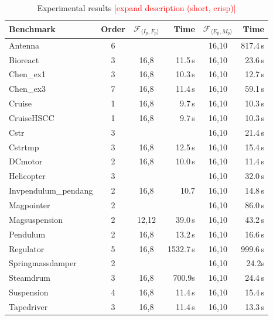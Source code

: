 \documentclass[twocolumn]{autart}    %
\newcommand{\xmark}{\ding{55}}
\renewcommand{\note}[1]{\textcolor{red}{[#1]}}
\begin{document}
\begin{table}
\centering
\begin{tabular}{| l | c | c | r | c | r |}
%
\hline
 Benchmark  &  Order  & $\mathcal{F}_{\langle I_p,F_p \rangle}$ & Time & $\mathcal{F}_{\langle E_p, M_p \rangle}$ & Time \\\hline
 Antenna     & 6 &  & ~\xmark & 16,10 & 817.4\,s \\
 Bioreact    & 3 & 16,8 & 11.5\,s & 16,10 &23.6\,s \\
 Chen\_ex1   & 3 & 16,8 & 10.3\,s  & 16,10 & 12.7\,s \\
 Chen\_ex3   & 7 & 16,8  & 11.4\,s & 16,10 & 59.1\,s \\
 Cruise      & 1 & 16,8 & 9.7\,s & 16,10 & 10.3\,s \\
 CruiseHSCC & 1 & 16,8 & 9.7\,s & 16,10 & 10.3\,s  \\
 Cstr & 3 & & ~\xmark & 16,10 & 21.4\,s \\
 Cstrtmp  & 3 & 16,8 & 12.5\,s &16,10 & 15.4\,s \\
 DCmotor   & 2 & 16,8  & 10.0\,s & 16,10 & 11.4\,s  \\
 Helicopter   & 3 &  & ~\xmark & 16,10 & 32.0\,s \\
 Invpendulum\_pendang & 2 & 16,8  & 10.7 & 16,10 & 14.8\,s\\
 Magpointer   & 2 &  & ~\xmark & 16,10 & 86.0\,s \\
 Magsuspension  & 2 & 12,12  & 39.0\,s  & 16,10 & 43.2\,s \\
 Pendulum   & 2 & 16,8 & 13.2\,s & 16,10 & 16.6\,s\\
 Regulator   & 5 & 16,8 & 1532.7\,s & 16,10 & 999.6\,s\\
 Springmassdamper & 2 & & ~\xmark &16,10 & 24.2s \\
 Steamdrum   & 3 & 16,8  & 700.9s & 16,10 & 24.4\,s \\
 Suspension  & 4 & 16,8  & 11.4\,s & 16,10 &15.4\,s \\
 Tapedriver   & 3 & 16,8  & 11.4\,s &16,10 & 13.3\,s \\
\hline
%
\end{tabular}
\vspace{0.05in}
\caption{Experimental results \note{expand description (short, crisp)}\label{tab:results}}
\end{table}
\end{document}
